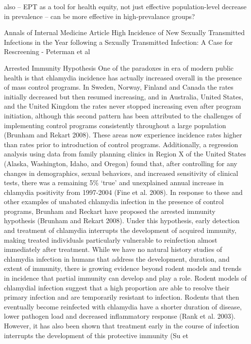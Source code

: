 \documentclass [11pt, proquest] {uwthesis}[2015/03/03]
\begin{document}
also -- EPT as a tool for health equity, not just effective
population-level decrease in prevalence -- can be more effective in
high-prevalance groups?

Annals of Internal Medicine Article High Incidence of New Sexually
Transmitted Infections in the Year following a Sexually Transmitted
Infection: A Case for Rescreening - Peterman et al

Arrested Immunity Hypothesis One of the paradoxes in era of modern
public health is that chlamydia incidence has actually increased overall
in the presence of mass control programs. In Sweden, Norway, Finland and
Canada the rates initially decreased but then resumed increasing, and in
Australia, United States, and the United Kingdom the rates never stopped
increasing even after program initiation, although this second pattern
has been attributed to the challenges of implementing control programs
consistently throughout a large population (Brunham and Rekart 2008).
These areas now experience incidence rates higher than rates prior to
introduction of control programs. Additionally, a regression analysis
using data from family planning clinics in Region X of the United States
(Alaska, Washington, Idaho, and Oregon) found that, after controlling
for any changes in demographics, sexual behaviors, and increased
sensitivity of clinical tests, there was a remaining 5\% `true' and
unexplained annual increase in chlamydia positivity from 1997-2004 (Fine
et al. 2008). In response to these and other examples of unabated
chlamydia infection in the presence of control programs, Brunham and
Reckart have proposed the arrested immunity hypothesis (Brunham and
Rekart 2008). Under this hypothesis, early detection and treatment of
chlamydia interrupts the development of acquired immunity, making
treated individuals particularly vulnerable to reinfection almost
immediately after treatment. While we have no natural history studies of
chlamydia infection in humans that address the development, duration,
and extent of immunity, there is growing evidence beyond rodent models
and trends in incidence that partial immunity can develop and play a
role. Rodent models of chlamydial infection suggest that a high
proportion are able to resolve their primary infection and are
temporarily resistant to infection. Rodents that then eventually become
reinfected with chlamydia have a shorter duration of disease, lower
pathogen load and decreased inflammatory response (Rank et al. 2003).
However, it has also been shown that treatment early in the course of
infection interrupts the development of this protective immunity (Su et
\end{document}
